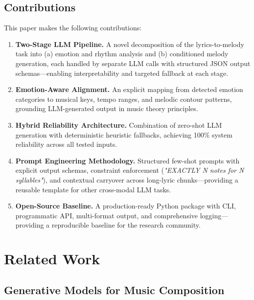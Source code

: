 \documentclass[conference]{IEEEtran}
\begin{document}
\subsection{Contributions}

This paper makes the following contributions:

\begin{enumerate}
  \item \textbf{Two-Stage LLM Pipeline.} A novel decomposition of the
        lyrics-to-melody task into (a) emotion and rhythm analysis and (b)
        conditioned melody generation, each handled by separate LLM calls with
        structured JSON output schemas---enabling interpretability and targeted
        fallback at each stage.

  \item \textbf{Emotion-Aware Alignment.} An explicit mapping from detected
        emotion categories to musical keys, tempo ranges, and melodic contour
        patterns, grounding LLM-generated output in music theory principles.

  \item \textbf{Hybrid Reliability Architecture.} Combination of zero-shot LLM
        generation with deterministic heuristic fallbacks, achieving 100\%
        system reliability across all tested inputs.

  \item \textbf{Prompt Engineering Methodology.} Structured few-shot prompts
        with explicit output schemas, constraint enforcement (\textit{"EXACTLY N
        notes for N syllables"}), and contextual carryover across long-lyric
        chunks---providing a reusable template for other cross-modal LLM tasks.

  \item \textbf{Open-Source Baseline.} A production-ready Python package with
        CLI, programmatic API, multi-format output, and comprehensive
        logging---providing a reproducible baseline for the research community.
\end{enumerate}

\section{Related Work}

\subsection{Generative Models for Music Composition}
\end{document}
